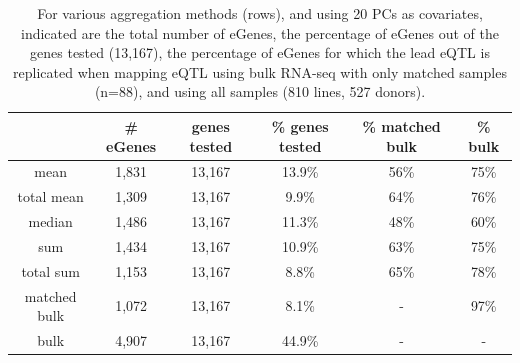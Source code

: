 




\begin{table}[h]
    \centering
    \begin{tabular}{c|c c c c c}
    & \# eGenes & genes tested & \% genes tested & \% matched bulk  & \% bulk   \\
    \hline
    mean         &  1,831 & 13,167 & 13.9\% & 56\% & 75\% \\
    total mean   &  1,309 & 13,167 &  9.9\% & 64\% & 76\% \\
    median       &  1,486 & 13,167 & 11.3\% & 48\% & 60\% \\
    sum          &  1,434 & 13,167 & 10.9\% & 63\% & 75\% \\
    total sum    &  1,153 & 13,167 &  8.8\% & 65\% & 78\% \\
    matched bulk &  1,072 & 13,167 &  8.1\% & - & 97\% \\
    bulk         &  4,907 & 13,167 & 44.9\% & - & - \\
    \end{tabular}
    \caption[Aggregation method comparison]{For various aggregation methods (rows), and using 20 PCs as covariates, indicated are the total number of eGenes, the percentage of eGenes out of the genes tested (13,167), the percentage of eGenes for which the lead eQTL is replicated when mapping eQTL using bulk RNA-seq with only matched samples (n=88), and using all samples (810 lines, 527 donors).}
    \label{tab:egenes}
\end{table}




